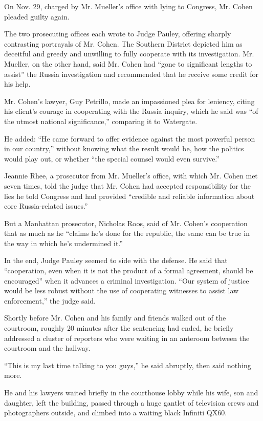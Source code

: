 On Nov. 29, charged by Mr. Mueller's office with lying to Congress, Mr.
Cohen pleaded guilty again.

The two prosecuting offices each wrote to Judge Pauley, offering sharply
contrasting portrayals of Mr. Cohen. The Southern District depicted him
as deceitful and greedy and unwilling to fully cooperate with its
investigation. Mr. Mueller, on the other hand, said Mr. Cohen had ``gone
to significant lengths to assist'' the Russia investigation and
recommended that he receive some credit for his help.

Mr. Cohen's lawyer, Guy Petrillo, made an impassioned plea for leniency,
citing his client's courage in cooperating with the Russia inquiry,
which he said was ``of the utmost national significance,'' comparing it
to Watergate.

He added: ``He came forward to offer evidence against the most powerful
person in our country,'' without knowing what the result would be, how
the politics would play out, or whether ``the special counsel would even
survive.''

Jeannie Rhee, a prosecutor from Mr. Mueller's office, with which Mr.
Cohen met seven times, told the judge that Mr. Cohen had accepted
responsibility for the lies he told Congress and had provided ``credible
and reliable information about core Russia-related issues.''

But a Manhattan prosecutor, Nicholas Roos, said of Mr. Cohen's
cooperation that as much as he ``claims he's done for the republic, the
same can be true in the way in which he's undermined it.''

In the end, Judge Pauley seemed to side with the defense. He said that
``cooperation, even when it is not the product of a formal agreement,
should be encouraged'' when it advances a criminal investigation. ``Our
system of justice would be less robust without the use of cooperating
witnesses to assist law enforcement,'' the judge said.

Shortly before Mr. Cohen and his family and friends walked out of the
courtroom, roughly 20 minutes after the sentencing had ended, he briefly
addressed a cluster of reporters who were waiting in an anteroom between
the courtroom and the hallway.

``This is my last time talking to you guys,'' he said abruptly, then
said nothing more.

He and his lawyers waited briefly in the courthouse lobby while his
wife, son and daughter, left the building, passed through a huge gantlet
of television crews and photographers outside, and climbed into a
waiting black Infiniti QX60.

